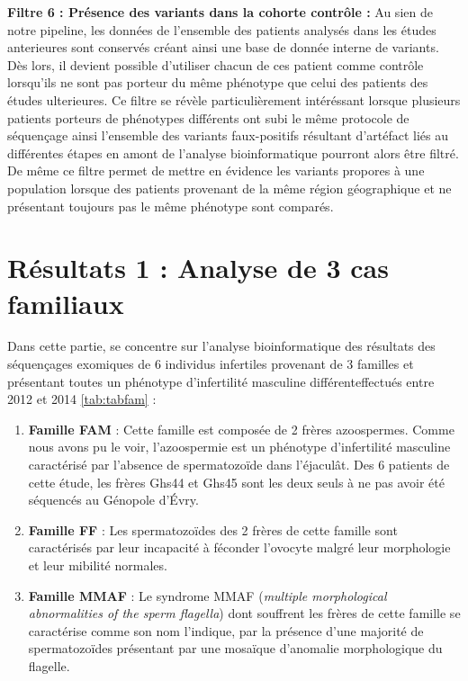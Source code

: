 \documentclass[12pt,twoside]{reedthesis}
\providecommand{\tightlist}{%
  \setlength{\itemsep}{0pt}\setlength{\parskip}{0pt}}
\theoremstyle{definition}
\theoremstyle{definition}
\theoremstyle{remark}
\begin{document}
\begin{enumerate}
    \textbf{Filtre 6 : Présence des variants dans la cohorte contrôle :}
    Au sien de notre pipeline, les données de l'ensemble des patients
    analysés dans les études anterieures sont conservés créant ainsi une
    base de donnée interne de variants. Dès lors, il devient possible
    d'utiliser chacun de ces patient comme contrôle lorsqu'ils ne sont pas
    porteur du même phénotype que celui des patients des études
    ulterieures. Ce filtre se révèle particulièrement intéréssant lorsque
    plusieurs patients porteurs de phénotypes différents ont subi le même
    protocole de séquençage ainsi l'ensemble des variants faux-positifs
    résultant d'artéfact liés au différentes étapes en amont de l'analyse
    bioinformatique pourront alors être filtré. De même ce filtre permet
    de mettre en évidence les variants propores à une population lorsque
    des patients provenant de la même région géographique et ne présentant
    toujours pas le même phénotype sont comparés.
  \end{enumerate}
  
  \newpage
  
  \section{Résultats 1 : Analyse de 3 cas
  familiaux}\label{resultats-1-analyse-de-3-cas-familiaux}
  
  Dans cette partie, se concentre sur l'analyse bioinformatique des
  résultats des séquençages exomiques de 6 individus infertiles provenant
  de 3 familles et présentant toutes un phénotype d'infertilité masculine
  différenteffectués entre 2012 et 2014 \ref{tab:tabfam} :
  
  \begin{enumerate}
  \def\labelenumi{\arabic{enumi}.}
  \tightlist
  \item
    \textbf{Famille FAM} : Cette famille est composée de 2 frères
    azoospermes. Comme nous avons pu le voir, l'azoospermie est un
    phénotype d'infertilité masculine caractérisé par l'absence de
    spermatozoïde dans l'éjaculât. Des 6 patients de cette étude, les
    frères Ghs44 et Ghs45 sont les deux seuls à ne pas avoir été séquencés
    au Génopole d'Évry.\\
  \item
    \textbf{Famille FF} : Les spermatozoïdes des 2 frères de cette famille
    sont caractérisés par leur incapacité à féconder l'ovocyte malgré leur
    morphologie et leur mibilité normales.\\
  \item
    \textbf{Famille MMAF} : Le syndrome MMAF (\emph{multiple morphological
    abnormalities of the sperm flagella}) dont souffrent les frères de
    cette famille se caractérise comme son nom l'indique, par la présence
    d'une majorité de spermatozoïdes présentant par une mosaïque
    d'anomalie morphologique du flagelle.
  \end{enumerate}
  
\end{document}
